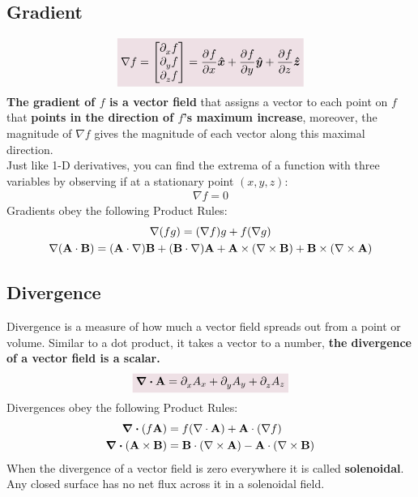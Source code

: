     \subsection*{Gradient}
        \begin{equation}
            \coloredanswer{\nabla f = \begin{bmatrix}
            \pder*{x}f
            \\
            \pder*{y}f
            \\
            \pder*{z}f
            \end{bmatrix} = \pder{f}{x}\e{x}+\pder{f}{y}\e{y}+\pder{f}{z}\e{z}}
        \end{equation}
        \textcolor{Blue1}{\bf The gradient of \(f\) is a vector field} that assigns a vector to each point on \(f\) that \textcolor{Blue1}{\bf points in the direction of \(f\)'s maximum increase}, moreover, the magnitude of \(\nabla f\) gives the magnitude of each vector along this maximal direction.
        \\[0.5 cm]
        Just like 1-D derivatives, you can find the extrema of a function with three variables by observing if at a stationary point \((x,y,z)\):
        \begin{align*}
            \nabla f = 0 
        \end{align*}
        Gradients obey the following Product Rules:
        \begin{gather*}
            \nabla (fg) = (\nabla f)g + f (\nabla g) 
            \\
            \nabla (\vb{A} \cdot \vb{B}) 
            = (\vb{A} \cdot \nabla)\vb{B} + (\vb{B} \cdot \nabla)\vb{A}+ \vb{A} \times (\nabla \times \vb{B}) + \vb{B} \times(\nabla \times \vb{A}) \\
        \end{gather*}
    \subsection*{Divergence}
        Divergence is a measure of how much a vector field spreads out from a point or volume.  Similar to a dot product, it takes a vector to a number, \textcolor{Blue1}{\bf the divergence of a vector field is a scalar.} 
        \begin{equation}
            \coloredanswer{\div\vb{A}=\pder*{x} A_x+\pder*{y} A_y+\pder*{z} A_z}
        \end{equation}
        Divergences obey the following Product Rules:
        \length[0.25 cm]
        \begin{align*}
            \div(f\vb{A}) &= f(\nabla \cdot \vb{A}) + \vb{A} \cdot (\nabla f)
            \\
            \div{(\vb{A} \times \vb{B})} &= \vb{B} \cdot (\nabla \times \vb{A}) - \vb{A} \cdot (\nabla \times \vb{B})
        \end{align*}
        \length{}
        When the divergence of a vector field is zero everywhere it is called {\bf solenoidal}. Any closed surface has no net flux across it in a solenoidal field.
